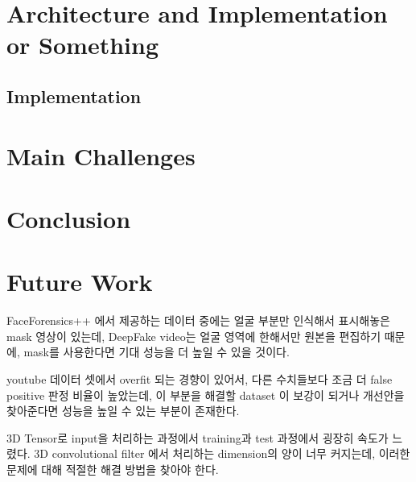 \documentclass{article}
\begin{document}
	\section{Architecture and Implementation or Something}
	
	\subsection{Implementation}
	
	
	
	\section{Main Challenges}
	
	
	\section{Conclusion}
	
	\section{Future Work}
	FaceForensics++ 에서 제공하는 데이터 중에는 얼굴 부분만 인식해서 표시해놓은 mask 영상이 있는데, DeepFake video는 얼굴 영역에 한해서만 원본을 편집하기 때문에, mask를 사용한다면 기대 성능을 더 높일 수 있을 것이다. 
	
	youtube 데이터 셋에서 overfit 되는 경향이 있어서, 다른 수치들보다 조금 더 false positive 판정 비율이 높았는데, 이 부분을 해결할 dataset 이 보강이 되거나 개선안을 찾아준다면 성능을 높일 수 있는 부분이 존재한다. 
	
	3D Tensor로 input을 처리하는 과정에서 training과 test 과정에서 굉장히 속도가 느렸다. 3D convolutional filter 에서 처리하는 dimension의 양이 너무 커지는데, 이러한 문제에 대해 적절한 해결 방법을 찾아야 한다.
	
	
	
	
	
	
	
\end{document}
